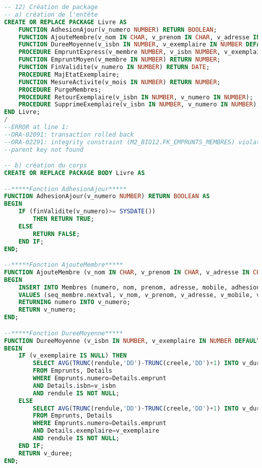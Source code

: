 \documentclass[10pt, oneside]{article}
\begin{document}
\begin{lstlisting}[language=sql, title=Question 12, label=QV12]
-- 12) Création de package
-- a) création de l'entête
CREATE OR REPLACE PACKAGE Livre AS
	FUNCTION AdhesionAjour(v_numero NUMBER) RETURN BOOLEAN;
	FUNCTION AjouteMembre(v_nom IN CHAR, v_prenom IN CHAR, v_adresse IN CHAR, v_mobile IN CHAR, v_adhesion IN DATE, v_duree IN NUMBER) RETURN NUMBER;
	FUNCTION DureeMoyenne(v_isbn IN NUMBER, v_exemplaire IN NUMBER DEFAULT NULL) RETURN NUMBER;
	PROCEDURE EmpruntExpress(v_membre NUMBER, v_isbn NUMBER, v_exemplaire NUMBER);
	FUNCTION EmpruntMoyen(v_membre IN NUMBER) RETURN NUMBER;
	FUNCTION FinValidite(v_numero IN NUMBER) RETURN DATE;
	PROCEDURE MajEtatExemplaire;
	FUNCTION MesureActivite(v_mois IN NUMBER) RETURN NUMBER;
	PROCEDURE PurgeMembres;
	PROCEDURE RetourExemplaire(v_isbn IN NUMBER, v_numero IN NUMBER);
	PROCEDURE SupprimeExemplaire(v_isbn IN NUMBER, v_numero IN NUMBER);
END Livre;
/
--ERROR at line 1:
--ORA-02091: transaction rolled back
--ORA-02291: integrity constraint (M2_BIO12.FK_EMPRUNTS_MEMBRES) violated -
--parent key not found

-- b) création du corps
CREATE OR REPLACE PACKAGE BODY Livre AS

--*****Fonction AdhesionAjour*****
FUNCTION AdhesionAjour(v_numero NUMBER) RETURN BOOLEAN AS
BEGIN 
	IF (finValidite(v_numero)>= SYSDATE())
		THEN RETURN TRUE;
	ELSE 
		RETURN FALSE;
	END IF;
END;

--*****Fonction AjouteMembre*****
FUNCTION AjouteMembre (v_nom IN CHAR, v_prenom IN CHAR, v_adresse IN CHAR, v_mobile IN CHAR, v_adhesion IN DATE, v_duree IN NUMBER) RETURN NUMBER AS v_numero Membres.numero%TYPE;
BEGIN 
	INSERT INTO Membres (numero, nom, prenom, adresse, mobile, adhesion, duree)
	VALUES (seq_membre.nextval, v_nom, v_prenom, v_adresse, v_mobile, v_adhesion, v_duree)
	RETURNING numero INTO v_numero;
	RETURN v_numero;
END;

--*****Fonction DureeMoyenne*****
FUNCTION DureeMoyenne (v_isbn IN NUMBER, v_exemplaire IN NUMBER DEFAULT NULL) RETURN NUMBER IS v_duree NUMBER;
BEGIN
	IF (v_exemplaire IS NULL) THEN
		SELECT AVG(TRUNC(rendule,'DD')-TRUNC(creele,'DD')+1) INTO v_duree
		FROM Emprunts, Details
		WHERE Emprunts.numero=Details.emprunt
		AND Details.isbn=v_isbn
		AND rendule IS NOT NULL;
	ELSE
		SELECT AVG(TRUNC(rendule,'DD')-TRUNC(creele,'DD')+1) INTO v_duree
		FROM Emprunts, Details
		WHERE Emprunts.numero=Details.emprunt
		AND Details.exemplaire=v_exemplaire
		AND rendule IS NOT NULL;
	END IF;
	RETURN v_duree;
END;


\end{lstlisting}
\end{document}
